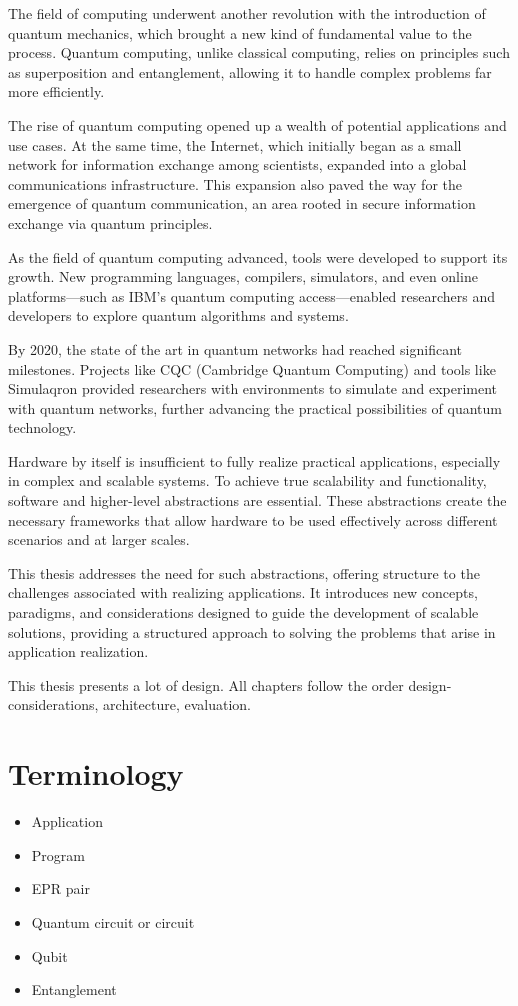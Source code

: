 The field of computing underwent another revolution with the introduction of quantum mechanics, which brought a new kind of fundamental value to the process.
Quantum computing, unlike classical computing, relies on principles such as superposition and entanglement, allowing it to handle complex problems far more efficiently.

The rise of quantum computing opened up a wealth of potential applications and use cases.
At the same time, the Internet, which initially began as a small network for information exchange among scientists, expanded into a global communications infrastructure.
This expansion also paved the way for the emergence of quantum communication, an area rooted in secure information exchange via quantum principles.

As the field of quantum computing advanced, tools were developed to support its growth.
New programming languages, compilers, simulators, and even online platforms—such as IBM's quantum computing access—enabled researchers and developers to explore quantum algorithms and systems.

By 2020, the state of the art in quantum networks had reached significant milestones.
Projects like CQC (Cambridge Quantum Computing) and tools like Simulaqron provided researchers with environments to simulate and experiment with quantum networks, further advancing the practical possibilities of quantum technology.



Hardware by itself is insufficient to fully realize practical applications, especially in complex and scalable systems.
To achieve true scalability and functionality, software and higher-level abstractions are essential.
These abstractions create the necessary frameworks that allow hardware to be used effectively across different scenarios and at larger scales.

This thesis addresses the need for such abstractions, offering structure to the challenges associated with realizing applications.
It introduces new concepts, paradigms, and considerations designed to guide the development of scalable solutions, providing a structured approach to solving the problems that arise in application realization.



This thesis presents a lot of design.
All chapters follow the order design-considerations, architecture, evaluation.


\section{Terminology}
\begin{itemize}
  \item Application
  \item Program
  \item EPR pair
  \item Quantum circuit or circuit
  \item Qubit
  \item Entanglement
\end{itemize}

